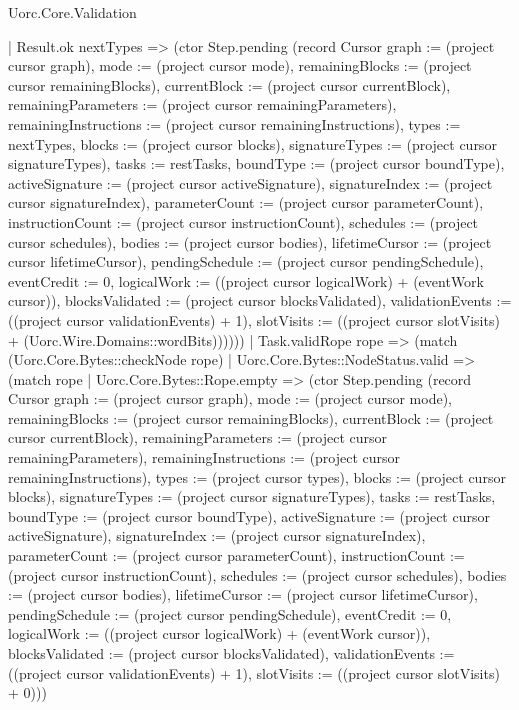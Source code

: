 \begin{lexlean}{Uorc.Core.Validation}
\begin{semanticmodule}
{          | Result.ok nextTypes => (ctor Step.pending (record Cursor {graph := (project cursor graph), mode := (project cursor mode), remainingBlocks := (project cursor remainingBlocks), currentBlock := (project cursor currentBlock), remainingParameters := (project cursor remainingParameters), remainingInstructions := (project cursor remainingInstructions), types := nextTypes, blocks := (project cursor blocks), signatureTypes := (project cursor signatureTypes), tasks := restTasks, boundType := (project cursor boundType), activeSignature := (project cursor activeSignature), signatureIndex := (project cursor signatureIndex), parameterCount := (project cursor parameterCount), instructionCount := (project cursor instructionCount), schedules := (project cursor schedules), bodies := (project cursor bodies), lifetimeCursor := (project cursor lifetimeCursor), pendingSchedule := (project cursor pendingSchedule), eventCredit := 0, logicalWork := ((project cursor logicalWork) + (eventWork cursor)), blocksValidated := (project cursor blocksValidated), validationEvents := ((project cursor validationEvents) + 1), slotVisits := ((project cursor slotVisits) + (Uorc.Wire.Domains::wordBits))}))))
      | Task.validRope rope => (match (Uorc.Core.Bytes::checkNode rope)
        | Uorc.Core.Bytes::NodeStatus.valid => (match rope
          | Uorc.Core.Bytes::Rope.empty => (ctor Step.pending (record Cursor {graph := (project cursor graph), mode := (project cursor mode), remainingBlocks := (project cursor remainingBlocks), currentBlock := (project cursor currentBlock), remainingParameters := (project cursor remainingParameters), remainingInstructions := (project cursor remainingInstructions), types := (project cursor types), blocks := (project cursor blocks), signatureTypes := (project cursor signatureTypes), tasks := restTasks, boundType := (project cursor boundType), activeSignature := (project cursor activeSignature), signatureIndex := (project cursor signatureIndex), parameterCount := (project cursor parameterCount), instructionCount := (project cursor instructionCount), schedules := (project cursor schedules), bodies := (project cursor bodies), lifetimeCursor := (project cursor lifetimeCursor), pendingSchedule := (project cursor pendingSchedule), eventCredit := 0, logicalWork := ((project cursor logicalWork) + (eventWork cursor)), blocksValidated := (project cursor blocksValidated), validationEvents := ((project cursor validationEvents) + 1), slotVisits := ((project cursor slotVisits) + 0)}))
}
\end{semanticmodule}
\end{lexlean}
